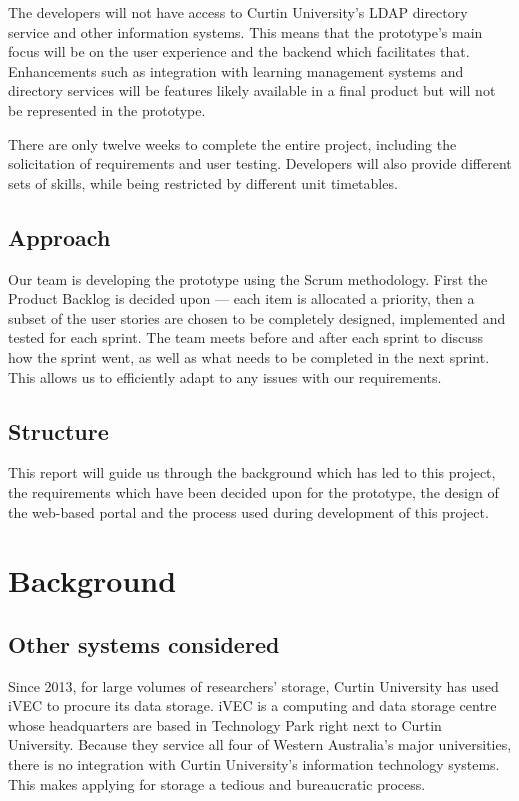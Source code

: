 \documentclass[a4paper,titlepage,12pt]{article}
\let\stdsection\section
\renewcommand\section{\newpage\stdsection}
\begin{document}
The developers will not have access to Curtin University's LDAP directory
service and other information systems. This means that the prototype's main
focus will be on the user experience and the backend which facilitates that.
Enhancements such as integration with learning management systems and directory
services will be features likely available in a final product but will not be
represented in the prototype.

There are only twelve weeks to complete the entire project, including the
solicitation of requirements and user testing. Developers will also provide
different sets of skills, while being restricted by different unit timetables.

\subsection{Approach}

Our team is developing the prototype using the Scrum methodology. First the
Product Backlog is decided upon --- each item is allocated a priority, then
a subset of the user stories are chosen to be completely designed, implemented
and tested for each sprint. The team meets before and after each sprint to
discuss how the sprint went, as well as what needs to be completed in the next
sprint. This allows us to efficiently adapt to any issues with our
requirements.

\subsection{Structure}

This report will guide us through the background which has led to this project,
the requirements which have been decided upon for the prototype, the design of
the web-based portal and the process used during development of this project.

\section{Background}

\subsection{Other systems considered}

Since 2013, for large volumes of researchers' storage, Curtin University has
used iVEC to procure its data storage. iVEC is a computing and data storage
centre whose headquarters are based in Technology Park right next to Curtin
University. Because they service all four of Western Australia's major
universities, there is no integration with Curtin University's information
technology systems. This makes applying for storage a tedious and bureaucratic
process.
\end{document}
